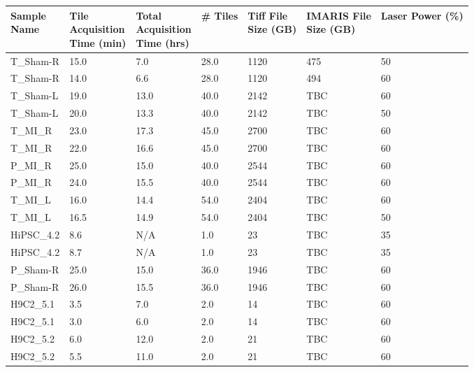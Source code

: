 \begin{table}[H]
\centering
    \begin{tabular}{|>{\small}l||>{\tiny}l|>{\tiny}l|>{\tiny}l|>{\tiny}l|>{\tiny}l|>{\tiny}l|}
    \hline
        \CellBreaker{Sample\\Name} &  \CellBreaker{Tile\\Acquisition\\Time (min)} & \CellBreaker{Total\\Acquisition\\Time (hrs)} & \# Tiles & \CellBreaker{Tiff File\\Size (GB)} & \CellBreaker{IMARIS File\\Size (GB)} & Laser Power (\%)\\ \hline
        T\_Sham-R  & 15.0 & 7.0 & 28.0 & 1120 & 475 & 50  \\ \hline
        T\_Sham-R  & 14.0 & 6.6 & 28.0 & 1120 & 494 & 60  \\ \hline
        T\_Sham-L  & 19.0 & 13.0 & 40.0 & 2142 & TBC & 60 \\ \hline
        T\_Sham-L  & 20.0 & 13.3 & 40.0 & 2142 & TBC & 50  \\ \hline
        T\_MI\_R  & 23.0 & 17.3 & 45.0 & 2700 & TBC & 60  \\ \hline
        T\_MI\_R  & 22.0 & 16.6 & 45.0 & 2700 & TBC & 60  \\ \hline
        P\_MI\_R  & 25.0 & 15.0 & 40.0 & 2544 & TBC & 60  \\ \hline
        P\_MI\_R  & 24.0 & 15.5 & 40.0 & 2544 & TBC & 60  \\ \hline
        T\_MI\_L  & 16.0 & 14.4 & 54.0 & 2404 & TBC & 60  \\ \hline
        T\_MI\_L  & 16.5 & 14.9 & 54.0 & 2404 & TBC & 50  \\ \hline
        HiPSC\_4.2  & 8.6 & N/A & 1.0 & 23 & TBC & 35  \\ \hline
        HiPSC\_4.2  & 8.7 & N/A & 1.0 & 23 & TBC & 35  \\ \hline
        P\_Sham-R  & 25.0 & 15.0 & 36.0 & 1946 & TBC & 60  \\ \hline
        P\_Sham-R & 26.0 & 15.5 & 36.0 & 1946 & TBC & 60  \\ \hline
        H9C2\_5.1  & 3.5 & 7.0 & 2.0 & 14 & TBC & 60  \\ \hline
        H9C2\_5.1  & 3.0 & 6.0 & 2.0 & 14 & TBC & 60  \\ \hline
        H9C2\_5.2  & 6.0 & 12.0 & 2.0 & 21 & TBC & 60  \\ \hline
        H9C2\_5.2  & 5.5 & 11.0 & 2.0 & 21 & TBC & 60  \\ \hline

\end{tabular}
\end{table}
